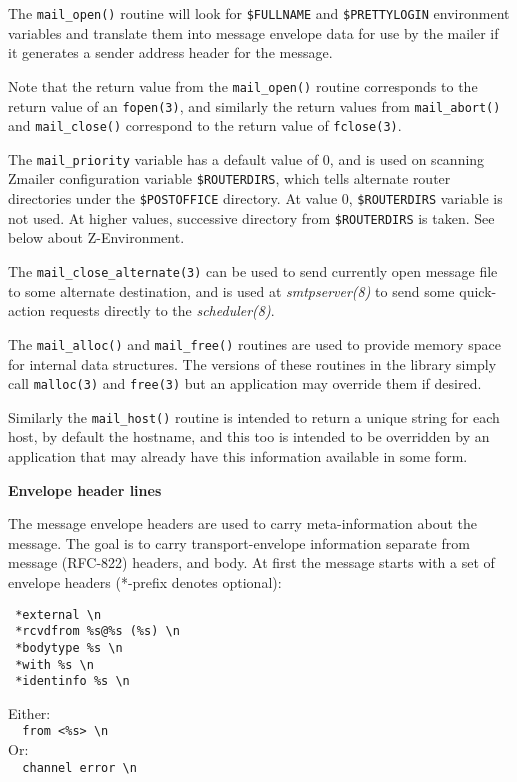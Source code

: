 The {\tt mail\_open()} routine will look for {\tt \$FULLNAME} 
and {\tt \$PRETTYLOGIN} environment variables and translate 
them into message envelope data for use by the mailer if it generates 
a sender address header for the message.

Note that the return value from the {\tt mail\_open()} routine
corresponds to the return value of an {\tt fopen(3)}, and similarly
the return values from {\tt mail\_abort()} and {\tt mail\_close()} 
correspond to the return value of {\tt fclose(3)}.

The {\tt mail\_priority} variable has a default value of 0, 
and is used on scanning Zmailer configuration variable 
{\tt \$ROUTERDIRS}, which tells alternate router directories 
under the {\tt \$POSTOFFICE} directory. At value 0, 
{\tt \$ROUTERDIRS} variable is not used. At higher values, 
successive directory from {\tt \$ROUTERDIRS} is taken. 
See below about Z-Environment.

The {\tt mail\_close\_alternate(3)} can be used to send currently
open message file to some alternate destination, and is
used at {\em smtpserver(8)\/} to send some quick-action requests
directly to the {\em scheduler(8)\/}.

The {\tt mail\_alloc()} and {\tt mail\_free()} routines are used 
to provide memory space for internal data structures. The versions
of these routines in the library simply call {\tt malloc(3)} and
{\tt free(3)} but an application may override them if desired.

Similarly the {\tt mail\_host()} routine is intended to return a
unique string for each host, by default the hostname, and
this too is intended to be overridden by an application
that may already have this information available in some form.

{\bf Envelope header lines}

The message envelope headers are used to carry meta-information
about the message.  The goal is to carry transport-envelope 
information separate from message (RFC-822) headers, and body.
At first the message starts with a set of envelope headers 
(*-prefix denotes optional):

\begin{verbatim}
 *external \n
 *rcvdfrom %s@%s (%s) \n
 *bodytype %s \n
 *with %s \n
 *identinfo %s \n
\end{verbatim}

Either: \\
\verb!  from <%s> \n! \\
Or: \\
\verb!  channel error \n! \\

